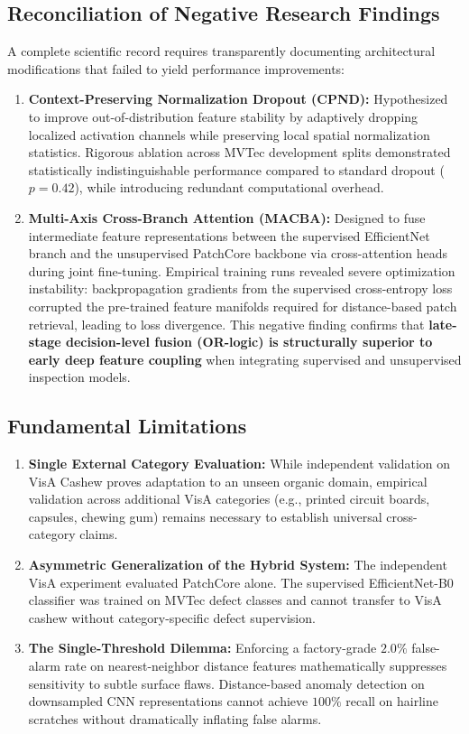\documentclass[journal]{IEEEtran}
\begin{document}
\subsection{Reconciliation of Negative Research Findings}
A complete scientific record requires transparently documenting architectural modifications that failed to yield performance improvements:
\begin{enumerate}
    \item \textbf{Context-Preserving Normalization Dropout (CPND):} Hypothesized to improve out-of-distribution feature stability by adaptively dropping localized activation channels while preserving local spatial normalization statistics. Rigorous ablation across MVTec development splits demonstrated statistically indistinguishable performance compared to standard dropout ($p = 0.42$), while introducing redundant computational overhead.
    \item \textbf{Multi-Axis Cross-Branch Attention (MACBA):} Designed to fuse intermediate feature representations between the supervised EfficientNet branch and the unsupervised PatchCore backbone via cross-attention heads during joint fine-tuning. Empirical training runs revealed severe optimization instability: backpropagation gradients from the supervised cross-entropy loss corrupted the pre-trained feature manifolds required for distance-based patch retrieval, leading to loss divergence. This negative finding confirms that \textbf{late-stage decision-level fusion (OR-logic) is structurally superior to early deep feature coupling} when integrating supervised and unsupervised inspection models.
\end{enumerate}

\subsection{Fundamental Limitations}
\begin{enumerate}
    \item \textbf{Single External Category Evaluation:} While independent validation on VisA Cashew proves adaptation to an unseen organic domain, empirical validation across additional VisA categories (e.g., printed circuit boards, capsules, chewing gum) remains necessary to establish universal cross-category claims.
    \item \textbf{Asymmetric Generalization of the Hybrid System:} The independent VisA experiment evaluated PatchCore alone. The supervised EfficientNet-B0 classifier was trained on MVTec defect classes and cannot transfer to VisA cashew without category-specific defect supervision.
    \item \textbf{The Single-Threshold Dilemma:} Enforcing a factory-grade $2.0\%$ false-alarm rate on nearest-neighbor distance features mathematically suppresses sensitivity to subtle surface flaws. Distance-based anomaly detection on downsampled CNN representations cannot achieve $100\%$ recall on hairline scratches without dramatically inflating false alarms.
\end{enumerate}
\end{document}
